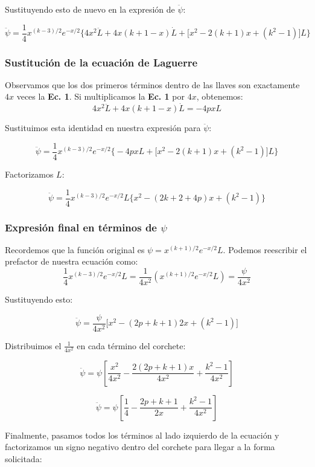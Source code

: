 \documentclass[a4paper]{article}
\begin{document}
Sustituyendo esto de nuevo en la expresión de $\ddot{\psi}$:

\[
\ddot{\psi} = \frac{1}{4} x^{(k-3)/2} e^{-x/2} \Big\{ 4x^2\ddot{L} + 4x(k+1-x)\dot{L} + \big[ x^2 - 2(k+1)x + (k^2 - 1) \big] L \Big\}
\]

\subsubsection{Sustitución de la ecuación de Laguerre}

Observamos que los dos primeros términos dentro de las llaves son exactamente $4x$ veces la \textbf{Ec. 1}. 
Si multiplicamos la \textbf{Ec. 1} por $4x$, obtenemos:
\[
4x^2\ddot{L} + 4x(k+1-x)\dot{L} = -4pxL
\]

Sustituimos esta identidad en nuestra expresión para $\ddot{\psi}$:

\[
\ddot{\psi} = \frac{1}{4} x^{(k-3)/2} e^{-x/2} \Big\{ -4pxL + \big[ x^2 - 2(k+1)x + (k^2 - 1) \big] L \Big\}
\]

Factorizamos $L$:

\[
\ddot{\psi} = \frac{1}{4} x^{(k-3)/2} e^{-x/2} L \Big\{ x^2 - (2k + 2 + 4p)x + (k^2 - 1) \Big\}
\]

\subsubsection[Expresión final en términos de psi]{Expresión final en términos de $\psi$}

Recordemos que la función original es $\psi = x^{(k+1)/2} e^{-x/2} L$. 
Podemos reescribir el prefactor de nuestra ecuación como:
\[
\frac{1}{4} x^{(k-3)/2} e^{-x/2} L = \frac{1}{4x^2} \left( x^{(k+1)/2} e^{-x/2} L \right) = \frac{\psi}{4x^2}
\]

Sustituyendo esto:

\[
\ddot{\psi} = \frac{\psi}{4x^2} \Big[ x^2 - (2p + k + 1)2x + (k^2 - 1) \Big]
\]

Distribuimos el $\frac{1}{4x^2}$ en cada término del corchete:

\[
\ddot{\psi} = \psi \left[ \frac{x^2}{4x^2} - \frac{2(2p + k + 1)x}{4x^2} + \frac{k^2 - 1}{4x^2} \right]
\]

\[
\ddot{\psi} = \psi \left[ \frac{1}{4} - \frac{2p + k + 1}{2x} + \frac{k^2 - 1}{4x^2} \right]
\]

Finalmente, pasamos todos los términos al lado izquierdo de la ecuación y factorizamos un signo negativo dentro del corchete para llegar a la forma solicitada:
\end{document}
